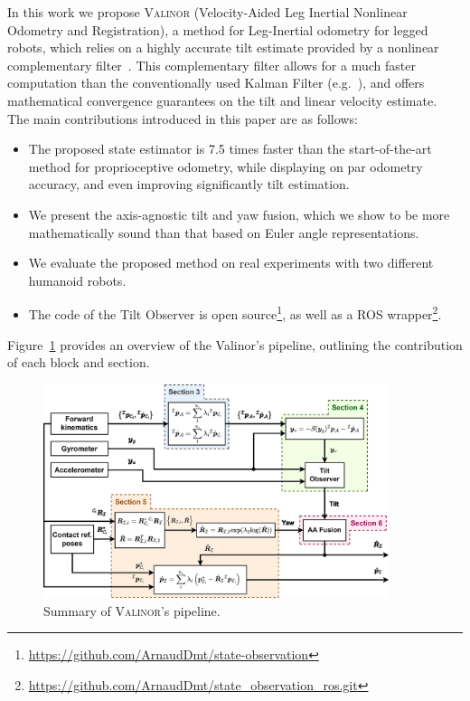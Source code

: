 \documentclass[10pt,twocolumn]{ICCAS}
\begin{document}
In this work we propose {\scshape Valinor} (Velocity-Aided Leg Inertial Nonlinear Odometry and Registration), a method for Leg-Inertial odometry for legged robots, which relies on a highly accurate tilt estimate provided by a nonlinear complementary filter~\cite{benallegue2020LyapunovStableOrientationEstimatorHumanoids}. This complementary filter allows for a much faster computation than the conventionally used Kalman Filter (e.g.~\cite{Hartley2020RIEKF}), and offers mathematical convergence guarantees on the tilt and linear velocity estimate. \\
The main contributions introduced in this paper are as follows:
\begin{itemize}
  \item The proposed state estimator is 7.5 times faster than the start-of-the-art method for proprioceptive odometry, while displaying on par odometry accuracy, and even improving significantly tilt estimation.
  \item We present the axis-agnostic tilt and yaw fusion, which we show to be more mathematically sound than that based on Euler angle representations.
  \item We evaluate the proposed method on real experiments with two different humanoid robots.
  \item The code of the Tilt Observer is open source\footnote{\scriptsize \url{https://github.com/ArnaudDmt/state-observation}}, as well as a ROS wrapper\footnote{\scriptsize \url{https://github.com/ArnaudDmt/state_observation_ros.git}}.
\end{itemize}
\noindent Figure~\ref{fig:summary} provides an overview of the Valinor's pipeline, outlining the contribution of each block and section.

\begin{figure}[thb]
\begin{center}
\includegraphics[width=0.90\textwidth]{Uploaded/summary.jpg}
\caption{\label{fig:summary}Summary of {\scshape Valinor}'s pipeline.}
\end{center}
\end{figure}
 
\end{document}
